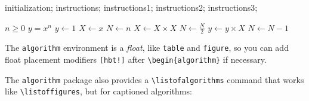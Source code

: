 \documentclass[11pt]{article}
\begin{document}
\begin{algorithm}[hbt!]
\caption{Example algorithm for use of while condition with caption}\label{alg:wordy}
\begin{algorithmic}
 \State initialization;
  \State instructions;
   \State instructions1;
   \State instructions2;
  \Else
   \State instructions3;
  \EndIf
 \EndWhile
\end{algorithmic}
\end{algorithm}





\begin{algorithm}[hbt!]
\caption{An algorithm with caption}\label{alg:cap}
\begin{algorithmic}
\Require $n \geq 0$
\Ensure $y = x^n$
\State $y \gets 1$
\State $X \gets x$
\State $N \gets n$
    \State $X \gets X \times X$
    \State $N \gets \frac{N}{2} $  
    \State $y \gets y \times X$
    \State $N \gets N - 1$
\EndIf
\EndWhile
\end{algorithmic}
\end{algorithm}

The \verb|algorithm| environment is a \emph{float}, like \verb|table| and \verb|figure|, so you can add float placement modifiers \verb|[hbt!]| after \verb|\begin{algorithm}| if necessary.



The \verb|algorithm| package also provides a \verb|\listofalgorithms| command that works like \verb|\listoffigures|, but for captioned algorithms:
\end{document}
